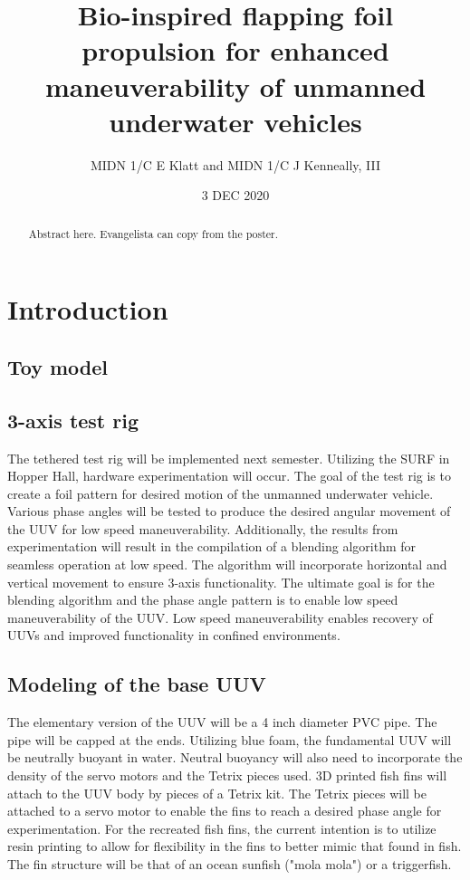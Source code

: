 \documentclass[10pt]{article}
\title{Bio-inspired flapping foil propulsion for enhanced maneuverability of unmanned underwater vehicles}
\author{MIDN 1/C E Klatt and MIDN 1/C J Kenneally, III}
\date{3 DEC 2020}
\begin{document}
\maketitle
\begin{abstract}
    Abstract here. Evangelista can copy from the poster. 
\end{abstract}


\section{Introduction}
\subsection{Toy model}
\subsection{3-axis test rig}
The tethered test rig will be implemented next semester.  Utilizing the SURF in Hopper Hall, hardware experimentation will occur.  The goal of the test rig is to create a foil pattern for desired motion of the unmanned underwater vehicle.  Various phase angles will be tested to produce the desired angular movement of the UUV for low speed maneuverability.  Additionally, the results from experimentation will result in the compilation of a blending algorithm for seamless operation at low speed.  The algorithm will incorporate horizontal and vertical movement to ensure 3-axis functionality.  The ultimate goal is for the blending algorithm and the phase angle pattern is to enable low speed maneuverability of the UUV.  Low speed maneuverability enables recovery of UUVs and improved functionality in confined environments.  

\subsection{Modeling of the base UUV}
The elementary version of the UUV will be a 4 inch diameter PVC pipe.  The pipe will be capped at the ends.  Utilizing blue foam, the fundamental UUV will be neutrally buoyant in water.  Neutral buoyancy will also need to incorporate the density of the servo motors and the Tetrix pieces used.  3D printed fish fins will attach to the UUV body by pieces of a Tetrix kit.  The Tetrix pieces will be attached to a servo motor to enable the fins to reach a desired phase angle for experimentation.  For the recreated fish fins, the current intention is to utilize resin printing to allow for flexibility in the fins to better mimic that found in fish.  The fin structure will be that of an ocean sunfish ("mola mola") or a triggerfish. 
 
\end{document}
